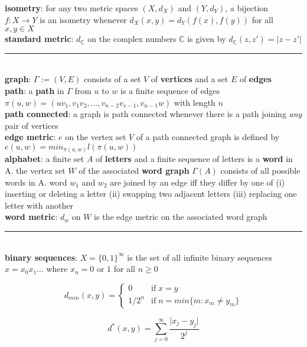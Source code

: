 \documentclass[a4paper]{article}
\newcommand*\abs[1]{\vert #1 \vert}
\newcommand*\linesep[0]{\noindent\rule{\textwidth}{0.5pt}\\}
\begin{document}
\begin{framed}
 	\noindent
 	\textbf{isometry}: for any two metric spaces $(X, d_X)$ and $(Y, d_Y)$, a bijection $f: X \rightarrow Y$ is an isometry whenever $d_X(x, y) = d_Y(f(x), f(y))$ for all $x, y \in X$\\
 	
 	\noindent
 	\textbf{standard metric}: $d_\mathbb{C}$ on the complex numbers $\mathbb{C}$ is given by $d_\mathbb{C}(z, z') = \abs{z - z'}$
 	
 	\linesep
 	\noindent
 	\textbf{graph}: $\Gamma := (V, E)$ consists of a set $V$ of \textbf{vertices} and a set $E$ of \textbf{edges}\\
 	
 	\noindent
 	\textbf{path}: a \textbf{path} in $\Gamma$ from $u$ to $w$ is a finite sequence of edges $\pi(u, w) = (uv_1, v_1v_2, \dots, v_{n-2}v_{v-1}, v_{n-1}w)$ with length $n$\\
 	
 	\noindent
 	\textbf{path connected}: a graph is path connected whenever there is a path joining \textit{any} pair of vertices\\
 	
 	\noindent
 	\textbf{edge metric}: $e$ on the vertex set $V$ of a path connected graph is defined by $e(u, w) = min_{\pi(u, w)} l(\pi(u, w))$\\
 	
 	\noindent
 	\textbf{alphabet}: a finite set $A$ of \textbf{letters} and a finite sequence of letters is a \textbf{word} in A. the vertex set $W$ of the associated \textbf{word graph} $\Gamma(A)$ consists of all possible words in A. word $w_1$ and $w_2$ are joined by an edge iff they differ by one of (i) inserting or deleting a letter (ii) swapping two adjacent letters (iii) replacing one letter with another\\
 	
 	\noindent
 	\textbf{word metric}: $d_w$ on $W$ is the edge metric on the associated word graph
 	
 	\linesep
 	\noindent
 	\textbf{binary sequences}: $X = \{0, 1\}^\infty$ is the set of all infinite binary sequences $x = x_0x_1\dots$ where $x_n = 0$ or $1$ for all $n \geq 0$
 	 
 	\[ d_{min}(x, y) = \begin{cases} 
      0 & \text{if} \; x = y \\
      1/2^n & \text{if} \; n = min\{m : x_m \neq y_m\}
      \end{cases}
	\]
	
	$$d^*(x, y) = \sum_{j=0}^\infty \frac{\abs{x_j - y_j}}{2^j}$$
	

\end{framed}
\end{document}
